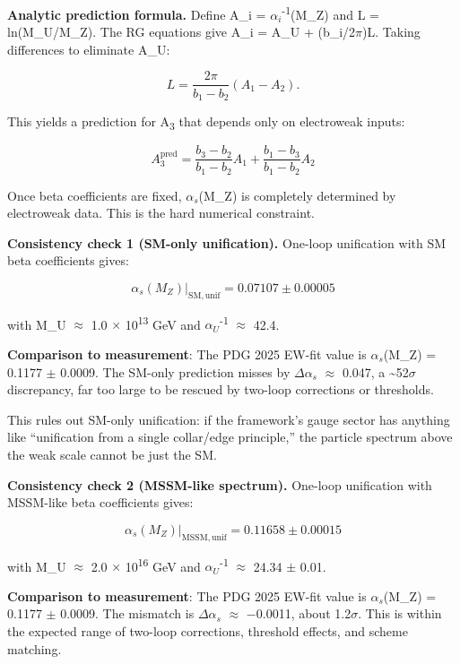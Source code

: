 \documentclass[11pt,a4paper]{article}
\theoremstyle{remark}
\begin{document}
\textbf{Analytic prediction formula.} Define A\_i = \(\alpha_i\)\textsuperscript{-1}(M\_Z) and
L = ln(M\_U/M\_Z). The RG equations give A\_i = A\_U + (b\_i/2\ensuremath{\pi})L. Taking
differences to eliminate A\_U:

\[
L = \frac{2\pi}{b_1 - b_2}(A_1 - A_2).
\]

This yields a prediction for A\textsubscript{3} that depends only on electroweak inputs:

\[
A_3^\mathrm{pred} = \frac{b_3 - b_2}{b_1 - b_2} A_1 + \frac{b_1 - b_3}{b_1 - b_2} A_2
\]

Once beta coefficients are fixed, \(\alpha_s\)(M\_Z) is completely determined by
electroweak data. This is the hard numerical constraint.

\textbf{Consistency check 1 (SM-only unification).} One-loop unification with SM beta
coefficients gives:

\[
\alpha_s(M_Z)|_\mathrm{SM,unif} = 0.07107 \pm 0.00005
\]

with M\_U \ensuremath{\approx} 1.0 \ensuremath{\times} 10\textsuperscript{13} GeV and \(\alpha_U\)\textsuperscript{-1} \ensuremath{\approx} 42.4.

\textbf{Comparison to measurement}: The PDG 2025 EW-fit value is
\(\alpha_s\)(M\_Z) = 0.1177 \ensuremath{\pm} 0.0009. The SM-only prediction misses by
\ensuremath{\Delta}\(\alpha_s\) \ensuremath{\approx} 0.047, a \textasciitilde52\ensuremath{\sigma} discrepancy, far too large to be rescued
by two-loop corrections or thresholds.

This rules out SM-only unification: if the framework's gauge sector has anything
like ``unification from a single collar/edge principle,'' the particle spectrum
above the weak scale cannot be just the SM.

\textbf{Consistency check 2 (MSSM-like spectrum).} One-loop unification with MSSM-like
beta coefficients gives:

\[
\alpha_s(M_Z)|_\mathrm{MSSM,unif} = 0.11658 \pm 0.00015
\]

with M\_U \ensuremath{\approx} 2.0 \ensuremath{\times} 10\textsuperscript{16} GeV and \(\alpha_U\)\textsuperscript{-1} \ensuremath{\approx} 24.34 \ensuremath{\pm} 0.01.

\textbf{Comparison to measurement}: The PDG 2025 EW-fit value is
\(\alpha_s\)(M\_Z) = 0.1177 \ensuremath{\pm} 0.0009. The mismatch is
\ensuremath{\Delta}\(\alpha_s\) \ensuremath{\approx} \ensuremath{-}0.0011, about 1.2\ensuremath{\sigma}. This is within the
expected range of two-loop corrections, threshold effects, and scheme
matching.
\end{document}

